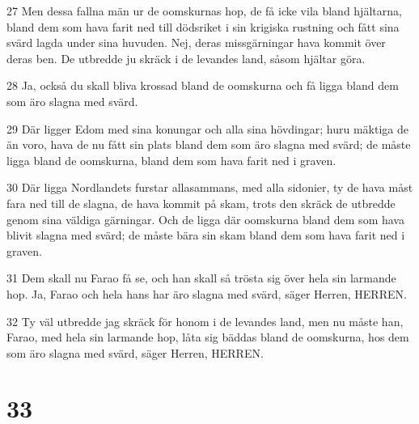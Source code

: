\par 27 Men dessa fallna män ur de oomskurnas hop, de få icke vila bland hjältarna, bland dem som hava farit ned till dödsriket i sin krigiska rustning och fått sina svärd lagda under sina huvuden. Nej, deras missgärningar hava kommit över deras ben. De utbredde ju skräck i de levandes land, såsom hjältar göra.
\par 28 Ja, också du skall bliva krossad bland de oomskurna och få ligga bland dem som äro slagna med svärd.
\par 29 Där ligger Edom med sina konungar och alla sina hövdingar; huru mäktiga de än voro, hava de nu fått sin plats bland dem som äro slagna med svärd; de måste ligga bland de oomskurna, bland dem som hava farit ned i graven.
\par 30 Där ligga Nordlandets furstar allasammans, med alla sidonier, ty de hava måst fara ned till de slagna, de hava kommit på skam, trots den skräck de utbredde genom sina väldiga gärningar. Och de ligga där oomskurna bland dem som hava blivit slagna med svärd; de måste bära sin skam bland dem som hava farit ned i graven.
\par 31 Dem skall nu Farao få se, och han skall så trösta sig över hela sin larmande hop. Ja, Farao och hela hans har äro slagna med svärd, säger Herren, HERREN.
\par 32 Ty väl utbredde jag skräck för honom i de levandes land, men nu måste han, Farao, med hela sin larmande hop, låta sig bäddas bland de oomskurna, hos dem som äro slagna med svärd, säger Herren, HERREN.

\chapter{33}

